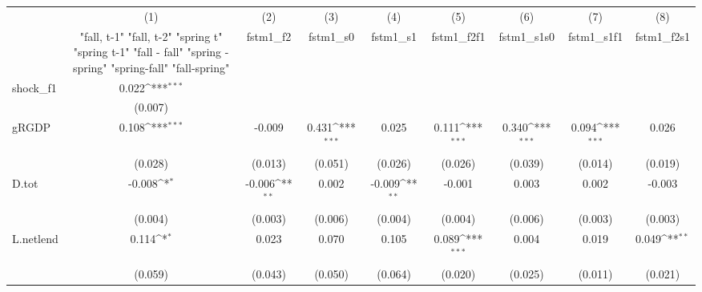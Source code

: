 {
\def\sym#1{\ifmmode^{#1}\else\(^{#1}\)\fi}
\begin{tabular}{l*{8}{c}}
\toprule
            &\multicolumn{1}{c}{(1)}&\multicolumn{1}{c}{(2)}&\multicolumn{1}{c}{(3)}&\multicolumn{1}{c}{(4)}&\multicolumn{1}{c}{(5)}&\multicolumn{1}{c}{(6)}&\multicolumn{1}{c}{(7)}&\multicolumn{1}{c}{(8)}\\
            &\multicolumn{1}{c}{  "fall, t-1" "fall, t-2" "spring t" "spring t-1"  "fall - fall" "spring - spring" "spring-fall" "fall-spring" }&\multicolumn{1}{c}{fstm1\_f2}&\multicolumn{1}{c}{fstm1\_s0}&\multicolumn{1}{c}{fstm1\_s1}&\multicolumn{1}{c}{fstm1\_f2f1}&\multicolumn{1}{c}{fstm1\_s1s0}&\multicolumn{1}{c}{fstm1\_s1f1}&\multicolumn{1}{c}{fstm1\_f2s1}\\
\midrule
shock\_f1    &       0.022\sym{***}&                     &                     &                     &                     &                     &                     &                     \\
            &     (0.007)         &                     &                     &                     &                     &                     &                     &                     \\
\addlinespace
gRGDP       &       0.108\sym{***}&      -0.009         &       0.431\sym{***}&       0.025         &       0.111\sym{***}&       0.340\sym{***}&       0.094\sym{***}&       0.026         \\
            &     (0.028)         &     (0.013)         &     (0.051)         &     (0.026)         &     (0.026)         &     (0.039)         &     (0.014)         &     (0.019)         \\
\addlinespace
D.tot       &      -0.008\sym{*}  &      -0.006\sym{**} &       0.002         &      -0.009\sym{**} &      -0.001         &       0.003         &       0.002         &      -0.003         \\
            &     (0.004)         &     (0.003)         &     (0.006)         &     (0.004)         &     (0.004)         &     (0.006)         &     (0.003)         &     (0.003)         \\
\addlinespace
L.netlend   &       0.114\sym{*}  &       0.023         &       0.070         &       0.105         &       0.089\sym{***}&       0.004         &       0.019         &       0.049\sym{**} \\
            &     (0.059)         &     (0.043)         &     (0.050)         &     (0.064)         &     (0.020)         &     (0.025)         &     (0.011)         &     (0.021)         \\

\end{tabular}}
